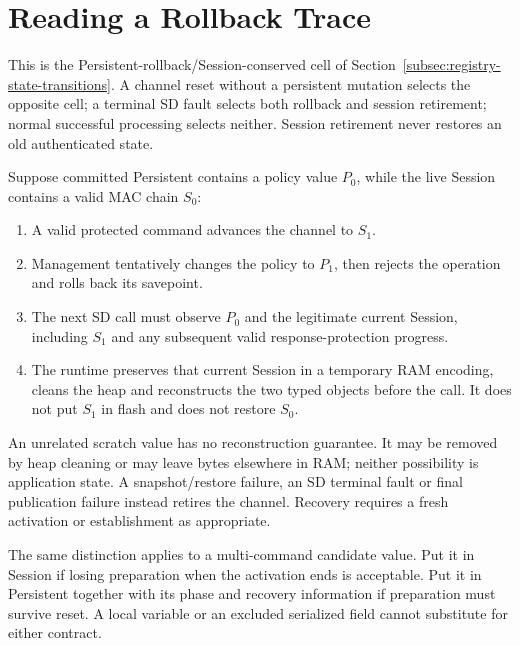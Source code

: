 \section{Reading a Rollback Trace}

This is the Persistent-rollback/Session-conserved cell of
Section~\ref{subsec:registry-state-transitions}. A channel reset without a
persistent mutation selects the opposite cell; a terminal SD fault selects
both rollback and session retirement; normal successful processing selects
neither. Session retirement never restores an old authenticated state.


Suppose committed Persistent contains a policy value $P_0$, while the live
Session contains a valid MAC chain $S_0$:
\begin{enumerate}
\item A valid protected command advances the channel to $S_1$.
\item Management tentatively changes the policy to $P_1$, then rejects the
  operation and rolls back its savepoint.
\item The next SD call must observe $P_0$ and the legitimate current Session,
  including $S_1$ and any subsequent valid response-protection progress.
\item The runtime preserves that current Session in a temporary RAM encoding,
  cleans the heap and reconstructs the two typed objects before the call.
  It does not put $S_1$ in flash and does not restore $S_0$.
\end{enumerate}

An unrelated scratch value has no reconstruction guarantee. It may be
removed by heap cleaning or may leave bytes elsewhere in RAM; neither
possibility is application state. A snapshot/restore failure, an SD terminal
fault or final publication failure instead retires the channel. Recovery
requires a fresh activation or establishment as appropriate.

The same distinction applies to a multi-command candidate value. Put it in
Session if losing preparation when the activation ends is acceptable. Put it
in Persistent together with its phase and recovery information if preparation
must survive reset. A local variable or an excluded serialized field cannot
substitute for either contract.
